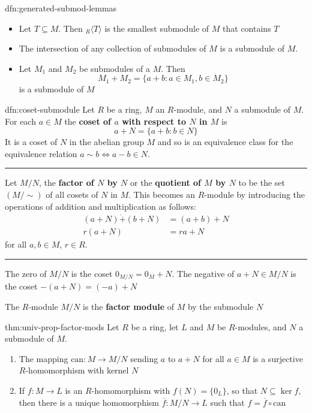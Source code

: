 \documentclass[landscape, 8pt]{extarticle}
\begin{document}
\begin{multicols}{3}
\begin{dfn}{dfn:generated-submod-lemmas}{}
    \begin{itemize}[leftmargin=*]
        \setlength\itemsep{0em}
        \item Let $T \subseteq M$. Then ${}_{R}\langle T \rangle$ is the smallest submodule of $M$ that contains $T$
        \item The intersection of any collection of submodules of $M$ is a submodule of $M$.
        \item Let $M_{1}$ and $M_{2}$ be submodules of a $M$. Then
            \[M_{1} + M_{2} = \{a + b : a\in M_{1}, b\in M_{2}\}\]
            is a submodule of $M$
    \end{itemize}
\end{dfn}

\begin{dfn}{dfn:coset-submodule}{}
    Let $R$ be a ring, $M$ an $R$-module, and $N$ a submodule of $M$. For each $a\in M$ the \textbf{coset of $a$ with respect to $N$ in $M$} is
    \[a + N = \{ a + b : b\in N\}\]
    It is a coset of $N$ in the abelian group $M$ and so is an equivalence class for the equivalence relation $a \sim b \iff a - b \in N$.

    \noindent\rule{\textwidth}{0.2pt}
    Let $M / N$, the \textbf{factor of $N$ by $N$} or the \textbf{quotient of $M$ by $N$} to be the set $(M / \sim)$ of all cosets of $N$ in $M$. This becomes an $R$-module by introducing the operations of addition and multiplication as follows:
    \begin{align*}
        (a + N) \dot{+} (b + N) &= (a + b) + N\\
        r(a + N) &= ra + N
    \end{align*}
    for all $a,b\in M$, $r\in R$.

    \noindent\rule{\textwidth}{0.2pt}
    The zero of $M / N$ is the coset $0_{M /N} = 0_{M} + N$. The negative of $a + N\in M / N$ is the coset $-(a + N) = (-a) + N$

    The $R$-module $M / N$ is the \textbf{factor module} of $M$ by the submodule $N$
\end{dfn}

\begin{thm}{thm:univ-prop-factor-mods}{}
    Let $R$ be a ring, let $L$ and $M$ be $R$-modules, and $N$ a submodule of $M$.
    \begin{enumerate}
        \setlength\itemsep{0em}
        \item The mapping $\text{can} : M\to M /N$ sending $a$ to $a + N$ for all $a\in M$ is a surjective $R$-homomorphism with kernel $N$
        \item If $f : M\to L$ is an $R$-homomorphism with $f(N) = \{0_{L}\}$, so that $N \subseteq \ker f$, then there is a unique homomorphism $\overline{f} : M /N \to L$ such that $f = \overline{f} \circ \text{can}$
    \end{enumerate}
\end{thm}


\end{multicols}
\end{document}
